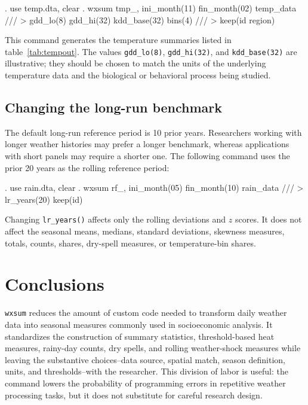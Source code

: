 \begin{stlog}
. use temp.dta, clear
. wxsum tmp_, ini_month(11) fin_month(02) temp_data ///
>     gdd_lo(8) gdd_hi(32) kdd_base(32) bins(4) ///
>     keep(id region)
\end{stlog}

This command generates the temperature summaries listed in table~\ref{tab:tempout}. The values \texttt{gdd\_lo(8)}, \texttt{gdd\_hi(32)}, and \texttt{kdd\_base(32)} are illustrative; they should be chosen to match the units of the underlying temperature data and the biological or behavioral process being studied.

\subsection{Changing the long-run benchmark}

The default long-run reference period is 10 prior years. Researchers working with longer weather histories may prefer a longer benchmark, whereas applications with short panels may require a shorter one. The following command uses the prior 20 years as the rolling reference period:

\begin{stlog}
. use rain.dta, clear
. wxsum rf_, ini_month(05) fin_month(10) rain_data ///
>     lr_years(20) keep(id)
\end{stlog}

Changing \texttt{lr\_years()} affects only the rolling deviations and $z$ scores. It does not affect the seasonal means, medians, standard deviations, skewness measures, totals, counts, shares, dry-spell measures, or temperature-bin shares.

\section{Conclusions}

\texttt{wxsum} reduces the amount of custom code needed to transform daily weather data into seasonal measures commonly used in socioeconomic analysis. It standardizes the construction of summary statistics, threshold-based heat measures, rainy-day counts, dry spells, and rolling weather-shock measures while leaving the substantive choices--data source, spatial match, season definition, units, and thresholds--with the researcher. This division of labor is useful: the command lowers the probability of programming errors in repetitive weather processing tasks, but it does not substitute for careful research design.


